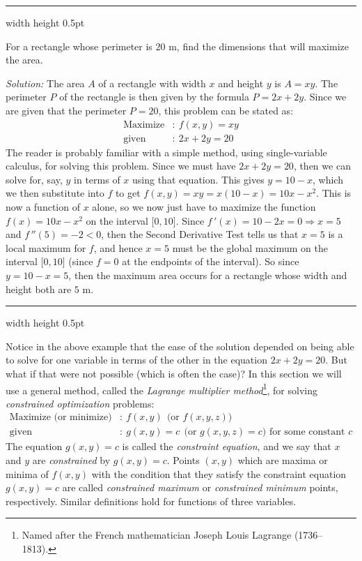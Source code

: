 \vspace{3mm}
\hrule width \textwidth height 0.5pt
\begin{exmp}\label{exmp:consimple}
 For a rectangle whose perimeter is $20$ m, find the dimensions that will maximize the area.\vspace{1mm}
 \par\noindent \emph{Solution:} The area $A$ of a rectangle with width $x$ and height $y$ is $A = xy$. The perimeter $P$
 of the rectangle is then given by the formula $P = 2x + 2y$. Since we are given that the perimeter $P = 20$, this
 problem can be stated as:
 \begin{align*}
  \text{Maximize}&: ~ f(x,y) = xy\\
  \text{given}&: ~ 2x + 2y = 20
 \end{align*}
 The reader is probably familiar with a simple method, using single-variable calculus, for solving this problem. Since
 we must have $2x+2y=20$, then we can solve for, say, $y$ in terms of $x$ using that equation. This gives $y = 10 - x$,
 which we then substitute into $f$ to get $f(x,y) = xy = x(10-x) = 10x - x^2$. 
 This is now a function of $x$ alone, so
 we now just have to maximize the function $f(x) = 10x - x^2$ on the interval $\lbrack 0, 10 \rbrack$. Since
 $f\,'(x) = 10-2x = 0 \Rightarrow x =5$ and $f\,''(5) = -2 < 0$, then the Second Derivative Test tells us that $x=5$ is
 a local maximum for $f$, and hence $x=5$ must be the global maximum on the interval $\lbrack 0, 10 \rbrack$ (since
 $f = 0$ at the endpoints of the interval). 
 So since $y=10-x =5$, then the maximum area occurs for a rectangle whose
 width and height both are $5$ m.
\end{exmp}
\hrule width \textwidth height 0.5pt
\vspace{3mm}

Notice in the above example that the ease of the solution depended on being able to solve for one variable in terms of
the other in the equation $2x+2y=20$. But what if that were not possible (which is often the case)?
In this section we will use a general method, called the
\emph{Lagrange multiplier method}\footnote{Named after the French mathematician Joseph Louis Lagrange (1736--1813).}, for
solving \emph{constrained optimization} problems:
\begin{align*}
 \text{Maximize (or minimize)}&: ~ f(x,y) ~~\text{(or $f(x,y,z)$)}\\
 \text{given}&: ~ g(x,y) = c ~~\text{(or $g(x,y,z) = c$) for some constant $c$}
\end{align*}
The equation $g(x,y) = c$ is called the \emph{constraint equation}, and we say that $x$ and $y$ are \emph{constrained}
by $g(x,y) = c$. Points $(x,y)$ which are maxima or minima of $f(x,y)$ with the condition that they satisfy
the constraint equation $g(x,y)=c$ are called \emph{constrained maximum} or \emph{constrained minimum} points,
respectively. Similar definitions hold for functions of three variables.

